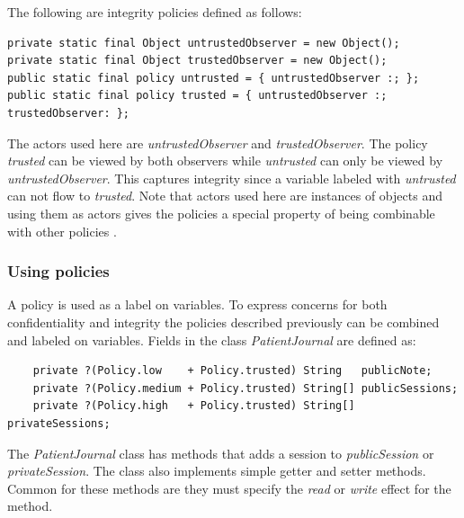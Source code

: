The following are integrity policies defined as follows:
\begin{lstlisting}
private static final Object untrustedObserver = new Object();
private static final Object trustedObserver = new Object();
public static final policy untrusted = { untrustedObserver :; };
public static final policy trusted = { untrustedObserver :; trustedObserver: };
\end{lstlisting}


The actors used here are \emph{untrustedObserver} and \emph{trustedObserver}. The policy \emph{trusted} can be viewed by both observers while \emph{untrusted} can only be viewed by \emph{untrustedObserver}. This captures integrity since a variable labeled with \emph{untrusted} can not flow to \emph{trusted}. Note that actors used here are instances of objects and using them as actors gives the policies a special property of being combinable with other policies \cite{paragonprogramming}.





\subsubsection{Using policies}
A policy is used as a label on variables. To express concerns for both confidentiality and integrity the policies described previously can be combined and labeled on variables. Fields in the class \emph{PatientJournal} are defined as:

\begin{lstlisting}
	private ?(Policy.low    + Policy.trusted) String   publicNote;
	private ?(Policy.medium + Policy.trusted) String[] publicSessions;
	private ?(Policy.high   + Policy.trusted) String[] privateSessions;
\end{lstlisting}

The \emph{PatientJournal} class has methods that adds a session to \emph{publicSession} or \emph{privateSession}. The class also implements simple getter and setter methods. Common for these methods are they must specify the \emph{read} or \emph{write} effect for the method.


